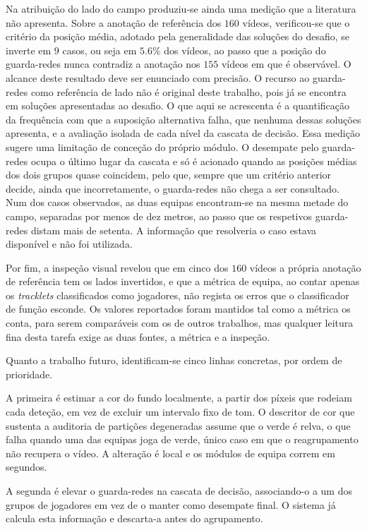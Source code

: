 Na atribuição do lado do campo produziu-se ainda uma medição que a literatura não apresenta. Sobre a
anotação de referência dos $160$ vídeos, verificou-se que o critério da posição média, adotado pela
generalidade das soluções do desafio, se inverte em $9$ casos, ou seja em $5.6\%$ dos vídeos, ao
passo que a posição do guarda-redes nunca contradiz a anotação nos $155$ vídeos em que é observável.
O alcance deste resultado deve ser enunciado com precisão. O recurso ao guarda-redes como
referência de lado não é original deste trabalho, pois já se encontra em soluções apresentadas ao
desafio. O que aqui se acrescenta é a quantificação da frequência com que a suposição alternativa
falha, que nenhuma dessas soluções apresenta, e a avaliação isolada de cada nível da cascata de
decisão. Essa medição sugere uma limitação de conceção do próprio módulo. O desempate pelo
guarda-redes ocupa o último lugar da cascata e só é acionado quando as posições médias dos dois
grupos quase coincidem, pelo que, sempre que um critério anterior decide, ainda que incorretamente,
o guarda-redes não chega a ser consultado. Num dos casos observados, as duas equipas encontram-se
na mesma metade do campo, separadas por menos de dez metros, ao passo que os respetivos
guarda-redes distam mais de setenta. A informação que resolveria o caso estava disponível e não foi
utilizada.

Por fim, a inspeção visual revelou que em cinco dos $160$ vídeos a própria anotação de referência
tem os lados invertidos, e que a métrica de equipa, ao contar apenas os \emph{tracklets}
classificados como jogadores, não regista os erros que o classificador de função esconde. Os valores
reportados foram mantidos tal como a métrica os conta, para serem comparáveis com os de outros
trabalhos, mas qualquer leitura fina desta tarefa exige as duas fontes, a métrica e a inspeção.

Quanto a trabalho futuro, identificam-se cinco linhas concretas, por ordem de prioridade.

A primeira é estimar a cor do fundo localmente, a partir dos píxeis que rodeiam cada deteção, em vez
de excluir um intervalo fixo de tom. O descritor de cor que sustenta a auditoria de partições
degeneradas assume que o verde é relva, o que falha quando uma das equipas joga de verde, único caso
em que o reagrupamento não recupera o vídeo. A alteração é local e os módulos de equipa correm em
segundos.

A segunda é elevar o guarda-redes na cascata de decisão, associando-o a um dos grupos de jogadores
em vez de o manter como desempate final. O sistema já calcula esta informação e descarta-a antes do
agrupamento.

